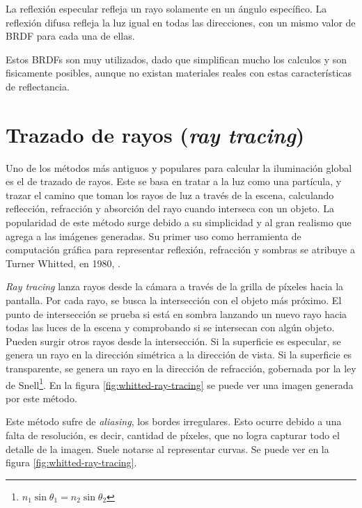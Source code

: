 La reflexión especular refleja un rayo solamente en un ángulo específico.
La reflexión difusa refleja la luz igual en todas las direcciones, con un mismo valor de BRDF para cada una de ellas.

Estos BRDFs son muy utilizados, dado que simplifican mucho los calculos y son fisicamente posibles, aunque no existan materiales reales con estas características de reflectancia.

\section{Trazado de rayos (\textit{ray tracing})}\label{sec:ray-tracing}

Uno de los métodos más antiguos y populares para calcular la iluminación global es el de trazado de rayos.
Este se basa en tratar a la luz como una partícula, y trazar el camino que toman los rayos de luz a través de la escena, calculando reflección, refracción y absorción del rayo cuando interseca con un objeto.
La popularidad de este método surge debido a su simplicidad y al gran realismo que agrega a las imágenes generadas.
Su primer uso como herramienta de computación gráfica para representar reflexión, refracción y sombras se atribuye a Turner Whitted, en 1980, \cite{whitted-1980}.

\textit{Ray tracing} lanza rayos desde la cámara a través de la grilla de píxeles hacia la pantalla.
Por cada rayo, se busca la intersección con el objeto más próximo.
El punto de intersección se prueba si está en sombra lanzando un nuevo rayo hacia todas las luces de la escena y comprobando si se intersecan con algún objeto.
Pueden surgir otros rayos desde la intersección.
Si la superficie es especular, se genera un rayo en la dirección simétrica a la dirección de vista.
Si la superficie es transparente, se genera un rayo en la dirección de refracción, gobernada por la ley de Snell\footnote{$n_1 \sin{\theta_1} = n_2 \sin{\theta_2}$}.
En la figura \ref{fig:whitted-ray-tracing} se puede ver una imagen generada por este método.

Este método sufre de \textit{aliasing}, los bordes irregulares.
Esto ocurre debido a una falta de resolución, es decir, cantidad de píxeles, que no logra capturar todo el detalle de la imagen.
Suele notarse al representar curvas.
Se puede ver en la figura \ref{fig:whitted-ray-tracing}.


